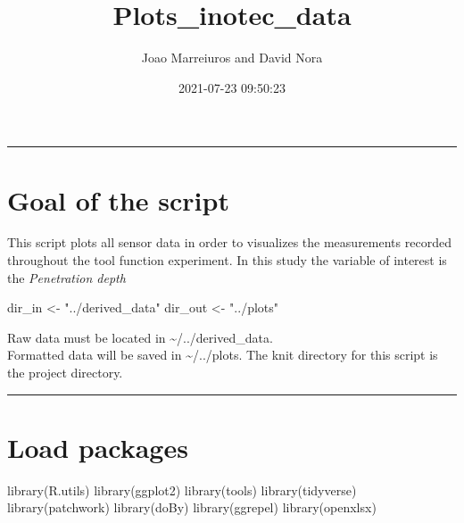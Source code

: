 \documentclass[
]{article}
\title{Plots\_inotec\_data}
\author{Joao Marreiuros and David Nora}
\date{2021-07-23 09:50:23}
\newenvironment{Shaded}{\begin{snugshade}}{\end{snugshade}}
\newcommand{\FunctionTok}[1]{\textcolor[rgb]{0.00,0.00,0.00}{#1}}
\newcommand{\NormalTok}[1]{#1}
\newcommand{\OtherTok}[1]{\textcolor[rgb]{0.56,0.35,0.01}{#1}}
\newcommand{\StringTok}[1]{\textcolor[rgb]{0.31,0.60,0.02}{#1}}
\begin{document}
\maketitle

\begin{center}\rule{0.5\linewidth}{0.5pt}\end{center}

\hypertarget{goal-of-the-script}{%
\section{Goal of the script}\label{goal-of-the-script}}

This script plots all sensor data in order to visualizes the
measurements recorded throughout the tool function experiment. In this
study the variable of interest is the \emph{Penetration depth}

\begin{Shaded}
\begin{Highlighting}[]
\NormalTok{dir\_in }\OtherTok{\textless{}{-}} \StringTok{"../derived\_data"}
\NormalTok{dir\_out }\OtherTok{\textless{}{-}} \StringTok{"../plots"}
\end{Highlighting}
\end{Shaded}

Raw data must be located in \textasciitilde/../derived\_data.\\
Formatted data will be saved in \textasciitilde/../plots. The knit
directory for this script is the project directory.

\begin{center}\rule{0.5\linewidth}{0.5pt}\end{center}

\hypertarget{load-packages}{%
\section{Load packages}\label{load-packages}}

\begin{Shaded}
\begin{Highlighting}[]
\FunctionTok{library}\NormalTok{(R.utils)}
\FunctionTok{library}\NormalTok{(ggplot2)}
\FunctionTok{library}\NormalTok{(tools)}
\FunctionTok{library}\NormalTok{(tidyverse)}
\FunctionTok{library}\NormalTok{(patchwork)}
\FunctionTok{library}\NormalTok{(doBy)}
\FunctionTok{library}\NormalTok{(ggrepel)}
\FunctionTok{library}\NormalTok{(openxlsx)}
\end{Highlighting}
\end{Shaded}
\end{document}
